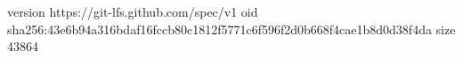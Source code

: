 version https://git-lfs.github.com/spec/v1
oid sha256:43e6b94a316bdaf16fccb80c1812f5771c6f596f2d0b668f4cae1b8d0d38f4da
size 43864
